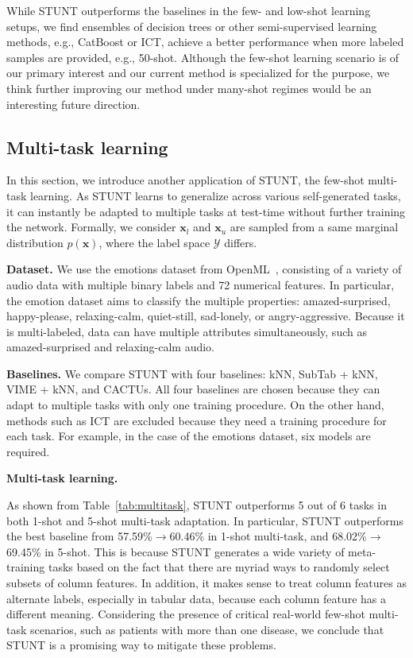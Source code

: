 While STUNT outperforms the baselines in the few- and low-shot learning setups, we find ensembles of decision trees or other semi-supervised learning methods, e.g., CatBoost or ICT, achieve a better performance when more labeled samples are provided, e.g., 50-shot. Although the few-shot learning scenario is of our primary interest and our current method is specialized for the purpose, we think further improving our method under many-shot regimes would be an interesting future direction.

\subsection{Multi-task learning}
\label{sec:multi_task}

In this section, we introduce another application of STUNT, the few-shot multi-task learning. As STUNT learns to generalize across various self-generated tasks, it can instantly be adapted to multiple tasks at test-time without further training the network. Formally, we consider
${\mathbf{x}}_l$ and ${\mathbf{x}}_u$ are sampled from a same marginal distribution $p({\mathbf{x}})$, where the label space $\mathcal{Y}$ differs.

\textbf{Dataset.}
We use the emotions dataset from OpenML~\citep{vanschoren2014openml}, consisting of a variety of audio data with multiple binary labels and 72 numerical features. In particular, the emotion dataset aims to classify the multiple properties: amazed-surprised, happy-please, relaxing-calm, quiet-still, sad-lonely, or angry-aggressive. Because it is multi-labeled, data can have multiple attributes simultaneously, such as amazed-surprised and relaxing-calm audio.

\textbf{Baselines.}
We compare STUNT with four baselines: kNN, SubTab + kNN, VIME + kNN, and CACTUs. All four baselines are chosen because they can adapt to multiple tasks with only one training procedure. On the other hand, methods such as ICT are excluded because they need a training procedure for each task. For example, in the case of the emotions dataset, six models are required.

\textbf{Multi-task learning.}

As shown from Table~\ref{tab:multitask}, STUNT outperforms 5 out of 6 tasks in both 1-shot and 5-shot multi-task adaptation. In particular, STUNT outperforms the best baseline from 57.59\%$\rightarrow$60.46\% in 1-shot multi-task, and 68.02\%$\rightarrow$69.45\% in 5-shot. This is because STUNT generates a wide variety of meta-training tasks based on the fact that there are myriad ways to randomly select subsets of column features. In addition, it makes sense to treat column features as alternate labels, especially in tabular data, because each column feature has a different meaning. Considering the presence of critical real-world few-shot multi-task scenarios, such as patients with more than one disease,  we conclude that STUNT is a promising way to mitigate these problems.

